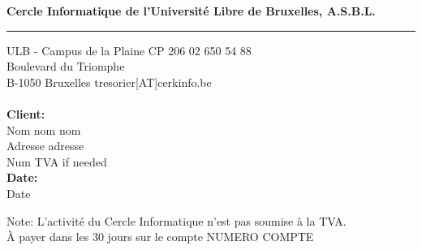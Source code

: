 \documentclass{invoice}
\def \tab {\hspace*{3ex}}
\begin{document}
\hfil{\large\bf Cercle Informatique de l'Université Libre de Bruxelles, A.S.B.L.}\hfil 
\break 
\hrule

ULB - Campus de la Plaine CP 206 \hfill 02 650 54 88 \\ 
Boulevard du Triomphe \\ B-1050 Bruxelles \hfill tresorier[AT]cerkinfo.be
\\ \\
{\bf Client:} \\
\tab Nom nom nom \\ 
\tab Adresse adresse \\ 
\tab Num TVA if needed \\

{\bf Date:} \\
\tab Date \\ 






\begin{invoiceTable}



\hline


\end{invoiceTable}


\vspace{1.5cm}

Note: L'activité du Cercle Informatique n'est pas soumise à la TVA. \\
À payer dans les 30 jours sur le compte NUMERO COMPTE \\
\end{document}
